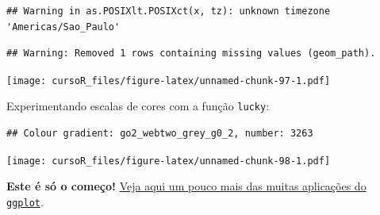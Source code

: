 \documentclass[]{book}
\newenvironment{Shaded}{\begin{snugshade}}{\end{snugshade}}
\newcommand{\KeywordTok}[1]{\textcolor[rgb]{0.13,0.29,0.53}{\textbf{#1}}}
\newcommand{\DataTypeTok}[1]{\textcolor[rgb]{0.13,0.29,0.53}{#1}}
\newcommand{\StringTok}[1]{\textcolor[rgb]{0.31,0.60,0.02}{#1}}
\newcommand{\CommentTok}[1]{\textcolor[rgb]{0.56,0.35,0.01}{\textit{#1}}}
\newcommand{\OperatorTok}[1]{\textcolor[rgb]{0.81,0.36,0.00}{\textbf{#1}}}
\newcommand{\NormalTok}[1]{#1}
\theoremstyle{definition}
\theoremstyle{definition}
\theoremstyle{definition}
\theoremstyle{remark}
\begin{document}
\begin{verbatim}
## Warning in as.POSIXlt.POSIXct(x, tz): unknown timezone 'Americas/Sao_Paulo'
\end{verbatim}

\begin{verbatim}
## Warning: Removed 1 rows containing missing values (geom_path).
\end{verbatim}

\texttt{[image: cursoR\_files/figure-latex/unnamed-chunk-97-1.pdf]}

Experimentando escalas de cores com a função \texttt{lucky}:

\begin{Shaded}
\end{Shaded}

\begin{verbatim}
## Colour gradient: go2_webtwo_grey_g0_2, number: 3263
\end{verbatim}

\texttt{[image: cursoR\_files/figure-latex/unnamed-chunk-98-1.pdf]}

\textbf{Este é só o começo!}
\href{http://r-statistics.co/Top50-Ggplot2-Visualizations-MasterList-R-Code.html}{Veja
aqui um pouco mais das muitas aplicações do \texttt{ggplot}}.
\end{document}
